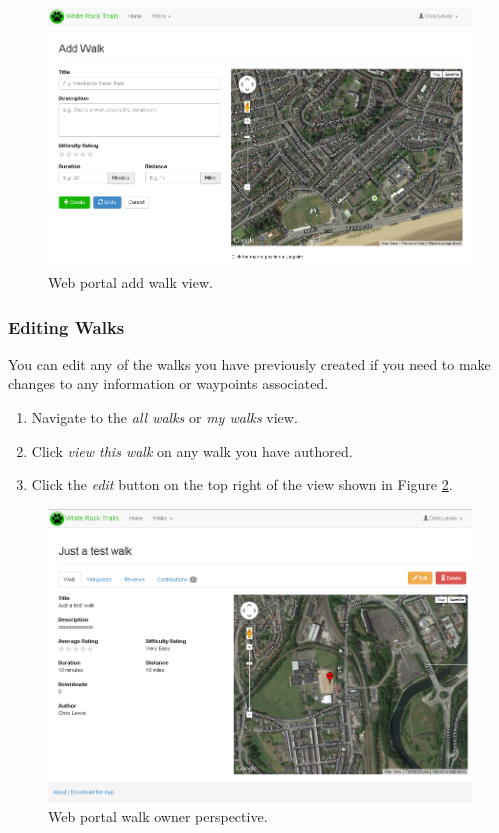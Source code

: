 \documentclass[11pt,a4paper]{report}
\begin{document}
\begin{figure}[H]
\centering
\includegraphics[width=0.8\linewidth]{./img/webportal/add-walk}
\caption{Web portal add walk view.}
\label{fig:add-walk-guide}
\end{figure}

\subsubsection{Editing Walks}

You can edit any of the walks you have previously created if you need to make changes to any information or waypoints associated.

\begin{enumerate}
\item Navigate to the \emph{all walks} or \emph{my walks} view.
\item Click \emph{view this walk} on any walk you have authored.
\item Click the \emph{edit} button on the top right of the view shown in Figure \ref{fig:walk-info-guide}.
\end{enumerate}

\begin{figure}[H]
\centering
\includegraphics[width=0.8\linewidth]{./img/webportal/walk-info}
\caption{Web portal walk owner perspective.}
\label{fig:walk-info-guide}
\end{figure}
\end{document}
